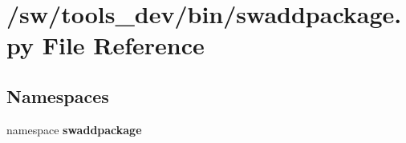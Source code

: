 \section{/sw/tools\_\-dev/bin/swaddpackage.py File Reference}
\label{swaddpackage_8py}
\subsection*{Namespaces}
\begin{CompactItemize}
\item 
namespace {\bf swaddpackage}
\end{CompactItemize}
